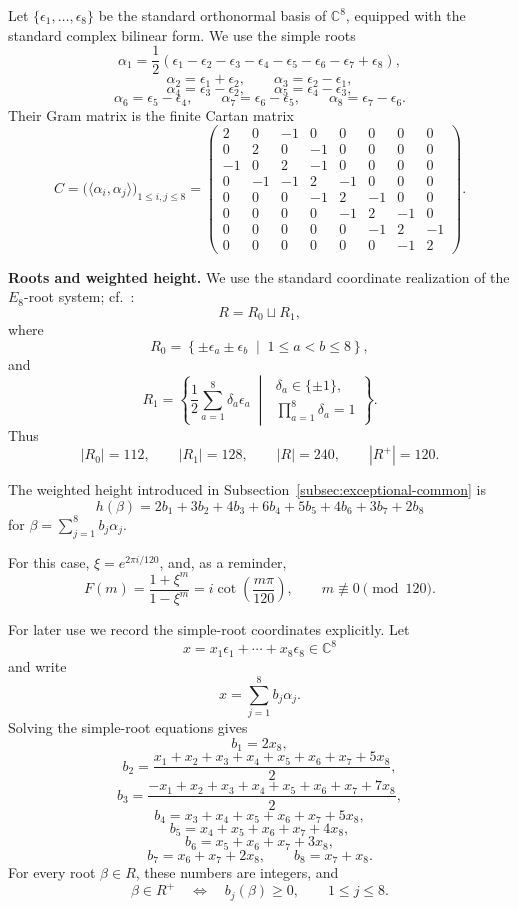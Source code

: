 \documentclass[a4paper,reqno]{amsart}
\theoremstyle{plain} %
\theoremstyle{definition} %
\theoremstyle{remark} %
\newcommand{\1}{\mathds{1}}   %
\begin{document}
Let $\{ \epsilon_1,\ldots,\epsilon_8 \} $
be the standard orthonormal basis of \(\mathbb C^8\), equipped with
the standard complex bilinear form.  We use the simple roots
\[
\alpha_1
=
\frac12
\left(
\epsilon_1-\epsilon_2-\epsilon_3-\epsilon_4
-\epsilon_5-\epsilon_6-\epsilon_7+\epsilon_8
\right),
\]
\[
\alpha_2=\epsilon_1+\epsilon_2,
\qquad
\alpha_3=\epsilon_2-\epsilon_1,
\]
\[
\alpha_4=\epsilon_3-\epsilon_2,
\qquad
\alpha_5=\epsilon_4-\epsilon_3,
\]
\[
\alpha_6=\epsilon_5-\epsilon_4,
\qquad
\alpha_7=\epsilon_6-\epsilon_5,
\qquad
\alpha_8=\epsilon_7-\epsilon_6.
\]
Their Gram matrix is the finite Cartan matrix
\[
C
=
\bigl(\langle\alpha_i,\alpha_j\rangle\bigr)_{1\le i,j\le8}
=
\begin{pmatrix}
2&0&-1&0&0&0&0&0\\
0&2&0&-1&0&0&0&0\\
-1&0&2&-1&0&0&0&0\\
0&-1&-1&2&-1&0&0&0\\
0&0&0&-1&2&-1&0&0\\
0&0&0&0&-1&2&-1&0\\
0&0&0&0&0&-1&2&-1\\
0&0&0&0&0&0&-1&2
\end{pmatrix}.
\]

\medskip

\noindent\textbf{Roots and weighted height.}
We use the standard coordinate realization of the \(E_8\)-root system;
cf.~\cite{Humphreys}:
\[
R=R_0\sqcup R_1,
\]
where
\[
R_0
=
\left\{
\pm\epsilon_a\pm\epsilon_b
\;\middle|\;
1\le a<b\le8
\right\},
\]
and
\[
R_1
=
\left\{
\frac12\sum_{a=1}^8\delta_a\epsilon_a
\;\middle|\;
\begin{array}{c}
\delta_a\in\{\pm1\},\\
\displaystyle\prod_{a=1}^8\delta_a=1
\end{array}
\right\}.
\]
Thus
\[
|R_0|=112,
\qquad
|R_1|=128,
\qquad
|R|=240,
\qquad
|R^+|=120.
\]

The weighted height introduced in
Subsection~\ref{subsec:exceptional-common} is
\[
h(\beta)
=
2b_1+3b_2+4b_3+6b_4+5b_5+4b_6+3b_7+2b_8
\]
for $\beta=\sum_{j=1}^8b_j\alpha_j$. 


For this case, $\xi=e^{2\pi i/120}$, 
and, as a reminder,
\[
F(m)
=
\frac{1+\xi^m}{1-\xi^m}
=
i\cot\left(\frac{m\pi}{120}\right),
\qquad
m\not\equiv0\pmod{120}.
\]

For later use we record the simple-root coordinates explicitly.  Let
\[
x=x_1\epsilon_1+\cdots+x_8\epsilon_8\in\mathbb C^8
\]
and write
\[
x=\sum_{j=1}^8b_j\alpha_j.
\]
Solving the simple-root equations gives
\[
b_1=2x_8,
\]
\[
b_2
=
\frac{
x_1+x_2+x_3+x_4+x_5+x_6+x_7+5x_8
}{2},
\]
\[
b_3
=
\frac{
-x_1+x_2+x_3+x_4+x_5+x_6+x_7+7x_8
}{2},
\]
\[
b_4=x_3+x_4+x_5+x_6+x_7+5x_8,
\]
\[
b_5=x_4+x_5+x_6+x_7+4x_8,
\]
\[
b_6=x_5+x_6+x_7+3x_8,
\]
\[
b_7=x_6+x_7+2x_8,
\qquad
b_8=x_7+x_8.
\]
For every root \(\beta\in R\), these numbers are integers, and
\[
\beta\in R^+
\quad\Longleftrightarrow\quad
b_j(\beta)\ge0,
\qquad
1\le j\le8.
\]
\end{document}
